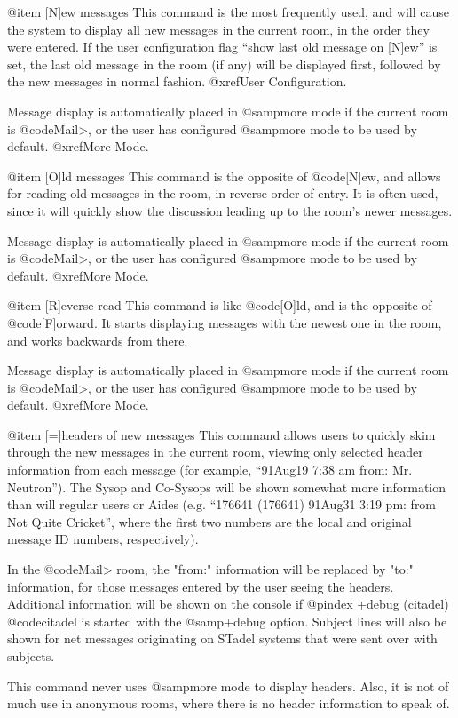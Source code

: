 @item [N]ew messages
This command is the most frequently used, and will cause the system to
display all new messages in the current room, in the order they were entered.
If the user configuration flag ``show last old message on [N]ew'' is set,
the last old message in the room (if any) will be displayed first,
followed by the new messages in normal fashion.  @xref{User Configuration}.

Message display is automatically placed in @samp{more} mode if the current
room is @code{Mail>}, or the user has configured @samp{more} mode to be used
by default.  @xref{More Mode}.

@item [O]ld messages
This command is the opposite of @code{[N]ew}, and allows for reading old
messages in the room, in reverse order of entry.  It is often used, since it
will quickly show the discussion leading up to the room's newer messages.

Message display is automatically placed in @samp{more} mode if the current
room is @code{Mail>}, or the user has configured @samp{more} mode to be used
by default.  @xref{More Mode}.

@item [R]everse read
This command is like @code{[O]ld}, and is the opposite of @code{[F]orward}.
It starts displaying messages with the newest one in the room, and works
backwards from there.

Message display is automatically placed in @samp{more} mode if the current
room is @code{Mail>}, or the user has configured @samp{more} mode to be used
by default.  @xref{More Mode}.

@item [=]headers of new messages
This command allows users to quickly skim through the new
messages in the current room, viewing only selected header information
from each message (for example, ``91Aug19 7:38 am from: Mr. Neutron'').
The Sysop and Co-Sysops will be shown somewhat more information than will
regular users or Aides (e.g. ``176641 (176641) 91Aug31 3:19 pm: from Not
Quite Cricket'', where the first two numbers are the local and original
message ID numbers, respectively).

In the @code{Mail>} room, the "from:" information will be replaced by
"to:" information, for those messages entered by the user seeing the
headers.  Additional information will be shown on the console if
@pindex +debug (citadel)
@code{citadel} is started with the @samp{+debug} option.  Subject lines
will also be shown for net messages originating on STadel systems that
were sent over with subjects.

This command never uses @samp{more} mode to display headers.  Also, it is
not of much use in anonymous rooms, where there is no header information
to speak of.

